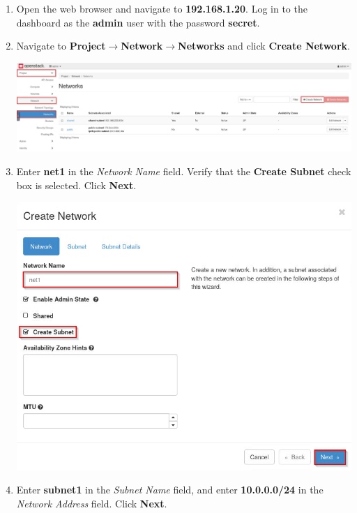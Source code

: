 \documentclass[letterpaper, 12pt]{article}
\begin{document}
\begin{enumerate}
    \item Open the web browser and navigate to \textbf{192.168.1.20}. Log in to the dashboard as the \textbf{admin} user
    with the password \textbf{secret}.

    \item Navigate to \textbf{Project$\rightarrow$Network$\rightarrow$Networks} and click \textbf{Create Network}.

    \begin{center}
        \includegraphics[width=\linewidth]{images/part3/step2.png}
    \end{center}

    \item Enter \textbf{net1} in the \textit{Network Name} field. Verify that the \textbf{Create Subnet} check box is
    selected. Click \textbf{Next}.

    \begin{center}
        \includegraphics[width=\linewidth]{images/part3/step3.png}
    \end{center}

    \item Enter \textbf{subnet1} in the \textit{Subnet Name} field, and enter \textbf{10.0.0.0/24} in the
    \textit{Network Address} field. Click \textbf{Next}.


\end{enumerate}
\end{document}
